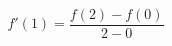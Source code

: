 \documentclass[preview]{standalone}
\begin{document}
\begin{align*}
f'(1) = \dfrac{f(2) - f(0)}{2 - 0}
\end{align*}
\end{document}
